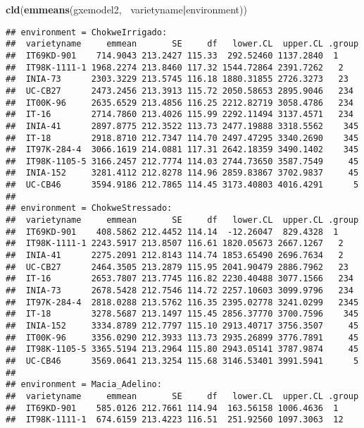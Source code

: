 \documentclass[]{book}
\newenvironment{Shaded}{\begin{snugshade}}{\end{snugshade}}
\newcommand{\KeywordTok}[1]{\textcolor[rgb]{0.13,0.29,0.53}{\textbf{#1}}}
\newcommand{\OperatorTok}[1]{\textcolor[rgb]{0.81,0.36,0.00}{\textbf{#1}}}
\newcommand{\NormalTok}[1]{#1}
\theoremstyle{definition}
\theoremstyle{definition}
\theoremstyle{definition}
\theoremstyle{remark}
\begin{document}
\begin{Shaded}
\begin{Highlighting}[]
\KeywordTok{cld}\NormalTok{(}\KeywordTok{emmeans}\NormalTok{(gxemodel2, }\OperatorTok{~}\NormalTok{varietyname}\OperatorTok{|}\NormalTok{environment))}
\end{Highlighting}
\end{Shaded}

\begin{verbatim}
## environment = ChokweIrrigado:
##  varietyname     emmean       SE     df   lower.CL  upper.CL .group
##  IT69KD-901    714.9043 213.2427 115.33  292.52460 1137.2840  1    
##  IT98K-1111-1 1968.2274 213.8460 117.32 1544.72864 2391.7262   2   
##  INIA-73      2303.3229 213.5745 116.18 1880.31855 2726.3273   23  
##  UC-CB27      2473.2456 213.3913 115.72 2050.58653 2895.9046   234 
##  IT00K-96     2635.6529 213.4856 116.25 2212.82719 3058.4786   234 
##  IT-16        2714.7860 213.4026 115.99 2292.11494 3137.4571   234 
##  INIA-41      2897.8775 212.3522 113.73 2477.19888 3318.5562    345
##  IT-18        2918.8710 212.7347 114.70 2497.47295 3340.2690    345
##  IT97K-284-4  3066.1619 214.0881 117.31 2642.18359 3490.1402    345
##  IT98K-1105-5 3166.2457 212.7774 114.03 2744.73650 3587.7549     45
##  INIA-152     3281.4112 212.8278 114.96 2859.83867 3702.9837     45
##  UC-CB46      3594.9186 212.7865 114.45 3173.40803 4016.4291      5
## 
## environment = ChokweStressado:
##  varietyname     emmean       SE     df   lower.CL  upper.CL .group
##  IT69KD-901    408.5862 212.4452 114.14  -12.26047  829.4328  1    
##  IT98K-1111-1 2243.5917 213.8507 116.61 1820.05673 2667.1267   2   
##  INIA-41      2275.2091 212.8143 114.74 1853.65490 2696.7634   2   
##  UC-CB27      2464.3505 213.2879 115.95 2041.90479 2886.7962   23  
##  IT-16        2653.7807 213.7745 116.82 2230.40488 3077.1566   234 
##  INIA-73      2678.5428 212.7546 114.72 2257.10603 3099.9796   234 
##  IT97K-284-4  2818.0288 213.5762 116.35 2395.02778 3241.0299   2345
##  IT-18        3278.5687 213.1497 115.45 2856.37770 3700.7596    345
##  INIA-152     3334.8789 212.7797 115.10 2913.40717 3756.3507     45
##  IT00K-96     3356.0290 212.3933 113.73 2935.26899 3776.7891     45
##  IT98K-1105-5 3365.5194 213.2964 115.80 2943.05141 3787.9874     45
##  UC-CB46      3569.0641 213.3254 115.68 3146.53401 3991.5941      5
## 
## environment = Macia_Adelino:
##  varietyname     emmean       SE     df   lower.CL  upper.CL .group
##  IT69KD-901    585.0126 212.7661 114.94  163.56158 1006.4636  1    
##  IT98K-1111-1  674.6159 213.4223 116.51  251.92560 1097.3063  12   

\end{verbatim}
\end{document}
